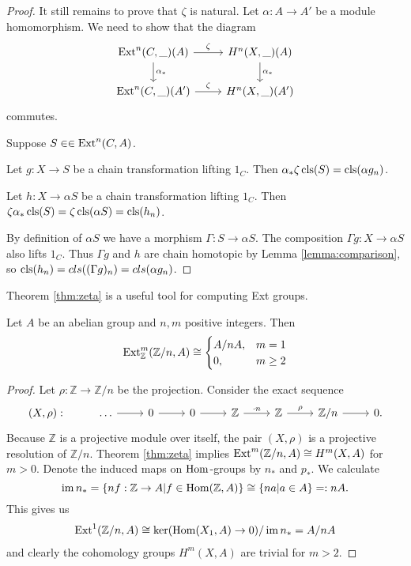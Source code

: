 \begin{proof}
It still remains to prove that $\zeta$ is natural.
Let $\alpha: A \to A'$ be a module homomorphism.
We need to show that the diagram
\begin{equation*}
\label{diag:zetanatural}
\begin{tikzcd}
\Ext{n}(C,\_)(A) 
	\arrow{r}{\zeta} 
	\arrow{d}{\alpha_*}&
H^n(X,\_)(A)
	\arrow{d}{\alpha_*}
\\
\Ext{n}(C,\_)(A') 
	\arrow{r}{\zeta} &
H^n(X,\_)(A')
\end{tikzcd}
\end{equation*}
commutes.

Suppose $S\in \in \operatorname{Ext}^{n}(C,A)$.

Let $g: X \to S$ be a chain transformation lifting $1_C$.
Then $\alpha_* \zeta \operatorname{cls}(S) = \operatorname{cls}(\alpha g_n)$.

Let $h: X \to \alpha S$ be a chain transformation lifting $1_C$.
Then $\zeta \alpha_* \operatorname{cls} (S) = \zeta \operatorname{cls}(\alpha S) = \operatorname{cls}(h_n)$.

By definition of $ \alpha S$ we have a morphism 
$\Gamma: S \to \alpha S$.
The composition $\Gamma g : X \to \alpha S$ also lifts $1_C$.
Thus $\Gamma g$ and $h$ are chain homotopic by Lemma \ref{lemma:comparison}, so $\operatorname{cls}(h_n) = cls((\Gamma g)_n) = cls(\alpha g_n)$.
\end{proof}
Theorem \ref{thm:zeta} is a useful tool for computing Ext groups.
\begin{application}
Let $A$ be an abelian group and $n,m$ positive integers.
Then 
\[\operatorname{Ext}^{m}_{\mathbb{Z}}(\mathbb{Z}/n,A) \cong \begin{cases}
A/nA, & m = 1\\
0, & m\geq 2
\end{cases}\]
\end{application}
\begin{proof}
Let $\rho: \mathbb{Z} \to \mathbb{Z}/n$ be the projection.
Consider the exact sequence
\[
\begin{tikzcd}
(X,\rho): &
\dots \arrow{r}&
0 \arrow{r} &
0 \arrow{r} &
\mathbb{Z} \arrow{r}{\cdot n} &
\mathbb{Z} \arrow{r}{\rho} &
\mathbb{Z}/n \arrow{r} &
0.
\end{tikzcd}
\]
Because $\mathbb{Z}$ is a projective module over itself, the pair $(X,\rho)$ is a projective resolution of $\mathbb{Z}/n$.
Theorem \ref{thm:zeta} implies $\operatorname{Ext}^{m}(\mathbb{Z}/n,A) \cong H^{m}(X,A)$ for $m >0$.
Denote the induced maps on $\operatorname{Hom}$-groups by $n_*$ and $p_*$.
We calculate
\[
\operatorname{im} n_* = \left\{nf:\mathbb{Z}\to A|f\in \operatorname{Hom}(\mathbb{Z},A)\right\} \cong \left\{na|a\in A\right\} =: nA.
\]
This gives us
\begin{align*}
\operatorname{Ext}^{1}(\mathbb{Z}/n,A) \cong \ker (\operatorname{Hom}(X_1,A) \to 0) / \operatorname{im} n_* = A / nA
\end{align*}
and clearly the cohomology groups $H^m(X,A)$ are trivial for $m>2$.
\end{proof}
